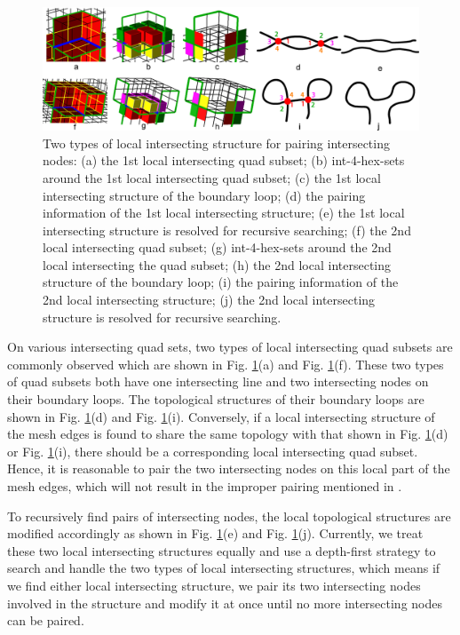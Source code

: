 \documentclass[final,5p,times,twocolumn]{elsarticle}
\begin{document}
\begin{figure}[htbp]
\begin{center}
\includegraphics[width=17cm]{pair_patterns.png}
\caption{Two types of local intersecting structure for pairing intersecting nodes: (a) the 1st local intersecting quad subset; (b) int-4-hex-sets around the 1st local intersecting quad subset; (c) the 1st local intersecting structure of the boundary loop; (d) the pairing information of the 1st local intersecting structure; (e) the 1st local intersecting structure is resolved for recursive searching; (f) the 2nd local intersecting quad subset; (g) int-4-hex-sets around the 2nd local intersecting the quad subset; (h) the 2nd local intersecting structure of the boundary loop; (i) the pairing information of the 2nd local intersecting structure; (j) the 2nd local intersecting structure is resolved for recursive searching.}
\label{fig:int_pair_tpl}
\end{center}
\end{figure}

On various intersecting quad sets, two types of local intersecting quad subsets are commonly observed which are shown in Fig. \ref{fig:int_pair_tpl}(a) and Fig. \ref{fig:int_pair_tpl}(f). These two types of quad subsets both have one intersecting line and two intersecting nodes on their boundary loops. The topological structures of their boundary loops are shown in Fig. \ref{fig:int_pair_tpl}(d) and Fig. \ref{fig:int_pair_tpl}(i). Conversely, if a local intersecting structure of the mesh edges is found to share the same topology with that shown in Fig. \ref{fig:int_pair_tpl}(d) or Fig. \ref{fig:int_pair_tpl}(i), there should be a corresponding local intersecting quad subset. Hence, it is reasonable to pair the two intersecting nodes on this local part of the mesh edges, which will not result in the improper pairing mentioned in \cite{Suzuki:2010hn}.

To recursively find pairs of intersecting nodes, the local topological structures are modified accordingly as shown in Fig. \ref{fig:int_pair_tpl}(e) and Fig. \ref{fig:int_pair_tpl}(j). Currently, we treat these two local intersecting structures equally and use a depth-first strategy to search and handle the two types of local intersecting structures, which means if we find either local intersecting structure, we pair its two intersecting nodes involved in the structure and modify it at once until no more intersecting nodes can be paired.
\end{document}
